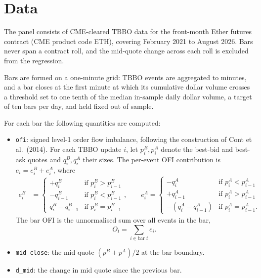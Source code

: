 \documentclass[11pt,a4paper]{article}
\begin{document}
\section{Data}

The panel consists of CME-cleared TBBO data for the front-month Ether futures contract (CME product code ETH), covering February 2021 to August 2026. Bars never span a contract roll, and the mid-quote change across each roll is excluded from the regression.

Bars are formed on a one-minute grid: TBBO events are aggregated to minutes, and a bar closes at the first minute at which its cumulative dollar volume crosses a threshold set to one tenth of the median in-sample daily dollar volume, a target of ten bars per day, and held fixed out of sample.

For each bar the following quantities are computed:
\begin{itemize}
    \item \texttt{ofi}: signed level-1 order flow imbalance, following the construction of Cont et al.\ (2014). For each TBBO update $i$, let $p^B_i, p^A_i$ denote the best-bid and best-ask quotes and $q^B_i, q^A_i$ their sizes. The per-event OFI contribution is $e_i = e^B_i + e^A_i$, where
    \begin{align*}
    e^B_i &=
    \begin{cases}
        +q^B_i              & \text{if } p^B_i > p^B_{i-1}  \\
        -q^B_{i-1}          & \text{if } p^B_i < p^B_{i-1}  \\
        q^B_i - q^B_{i-1}   & \text{if } p^B_i = p^B_{i-1}
    \end{cases},
    \qquad
    e^A_i =
    \begin{cases}
        -q^A_i              & \text{if } p^A_i < p^A_{i-1}  \\
        +q^A_{i-1}          & \text{if } p^A_i > p^A_{i-1}  \\
        -(q^A_i - q^A_{i-1})& \text{if } p^A_i = p^A_{i-1}.
    \end{cases}
    \end{align*}
     The bar OFI is the unnormalised sum over all events in the bar,
    \[ O_t = \sum_{i \in \text{bar } t} e_i. \]
    \item \texttt{mid\_close}: the mid quote $(p^B + p^A)/2$ at the bar boundary.
    \item \texttt{d\_mid}: the change in mid quote since the previous bar.
\end{itemize}
\end{document}
